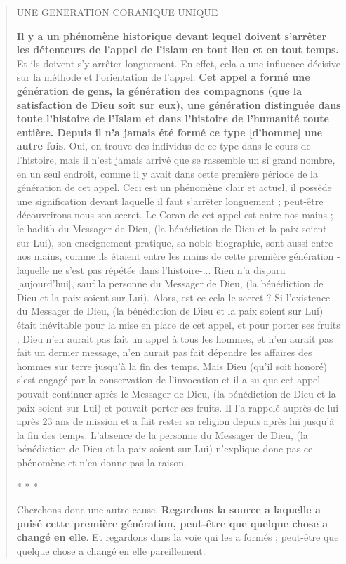 \begin{quote}
UNE GENERATION CORANIQUE UNIQUE

\textbf{Il y a un phénomène historique devant lequel doivent s'arrêter
les détenteurs de l'appel de l'islam en tout lieu et en tout temps.} Et
ils doivent s'y arrêter longuement. En effet, cela a une influence
décisive sur la méthode et l'orientation de l'appel. \textbf{Cet appel a
formé une génération de gens, la génération des compagnons (que la
satisfaction de Dieu soit sur eux), une génération distinguée dans toute
l'histoire de l'Islam et dans l'histoire de l'humanité toute entière.
Depuis il n'a jamais été formé ce type {[}d'homme{]} une autre fois}.
Oui, on trouve des individus de ce type dans le cours de l'histoire,
mais il n'est jamais arrivé que se rassemble un si grand nombre, en un
seul endroit, comme il y avait dans cette première période de la
génération de cet appel. Ceci est un phénomène clair et actuel, il
possède une signification devant laquelle il faut s'arrêter longuement ;
peut-être découvrirons-nous son secret. Le Coran de cet appel est entre
nos mains ; le hadith du Messager de Dieu, (la bénédiction de Dieu et la
paix soient sur Lui), son enseignement pratique, sa noble biographie,
sont aussi entre nos mains, comme ils étaient entre les mains de cette
première génération - laquelle ne s'est pas répétée dans l'histoire-...
Rien n'a disparu {[}aujourd'hui{]}, sauf la personne du Messager de
Dieu, (la bénédiction de Dieu et la paix soient sur Lui). Alors, est-ce
cela le secret ? Si l'existence du Messager de Dieu, (la bénédiction de
Dieu et la paix soient sur Lui) était inévitable pour la mise en place
de cet appel, et pour porter ses fruits ; Dieu n'en aurait pas fait un
appel à tous les hommes, et n'en aurait pas fait un dernier message,
n'en aurait pas fait dépendre les affaires des hommes sur terre jusqu'à
la fin des temps. Mais Dieu (qu'il soit honoré) s'est engagé par la
conservation de l'invocation et il a su que cet appel pouvait continuer
après le Messager de Dieu, (la bénédiction de Dieu et la paix soient sur
Lui) et pouvait porter ses fruits. Il l'a rappelé auprès de lui après 23
ans de mission et a fait rester sa religion depuis après lui jusqu'à la
fin des temps. L'absence de la personne du Messager de Dieu, (la
bénédiction de Dieu et la paix soient sur Lui) n'explique donc pas ce
phénomène et n'en donne pas la raison.

* * *

Cherchons donc une autre cause. \textbf{Regardons la source a laquelle a
puisé cette première génération, peut-être que quelque chose a changé en
elle}. Et regardons dans la voie qui les a formés ; peut-être que
quelque chose a changé en elle pareillement.


\end{quote}

